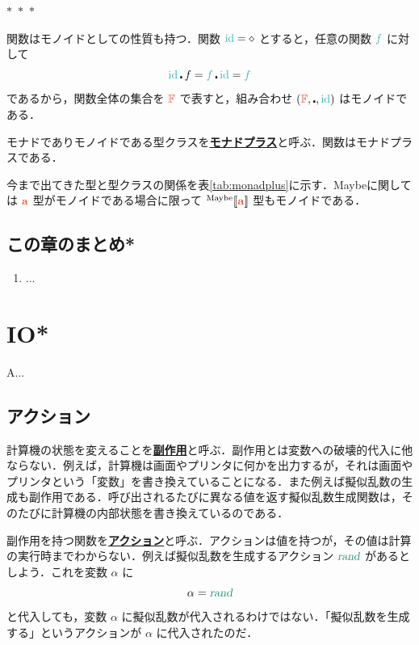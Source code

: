 \documentclass[a5paper,twoside,fleqn,draft]{jsbook}
\def\[{[\![}
\def\]{]\!]}
\def\funcColor{BlueGreen}
\def\actionColor{PineGreen}
\def\typeColor{RedOrange}
\newcommand{\separator}{\begin{center}$*$~$*$~$*$\end{center}}
\newcommand{\keyword}[1]{{\underline{\textbf{#1}}}}
\newcommand{\mAnonParam}{\diamond}
\newcommand{\mFunc}[1]{\textcolor{\funcColor}{#1}}
\newcommand{\mSpecialFunc}[1]{\textcolor{\funcColor}{\textrm{#1}}}
\newcommand{\mFFunc}{{\mFunc{f}}}
\DeclareMathOperator{\mId}{\mSpecialFunc{id}}
\newcommand{\mActionLong}[1]{\textcolor{\actionColor}{\textsl{#1}}}
\DeclareMathOperator{\mRand}{\mActionLong{rand}}
\DeclareMathOperator{\mCompFunc}{\centerdot}
\newcommand{\mSpecialSet}[1]{\textcolor{\typeColor}{\mathbb{#1}}}
\newcommand{\mFSet}{\mSpecialSet{F}}
\newcommand{\mType}[1]{\textcolor{\typeColor}{\mathbf{#1}}}
\newcommand{\mA}{\mType{a}}
\newcommand{\mTypeAssemble}[2]{{}^\mathrm{#1}\[\mType{#2}\]}
\newcommand{\mMaybeType}[1]{\mTypeAssemble{Maybe}{#1}}
\begin{document}
\separator

関数はモノイドとしての性質も持つ．関数 $\mId=\mAnonParam$ とすると，任意の関数 $\mFFunc$ に対して
\begin{equation}
\mId\mCompFunc f=\mFFunc\mCompFunc\mId=\mFFunc
\end{equation}
であるから，関数全体の集合を $\mFSet$ で表すと，組み合わせ $(\mFSet,\mCompFunc,\mId)$ はモノイドである．

モナドでありモノイドである型クラスを\keyword{モナドプラス}と呼ぶ．関数はモナドプラスである．

今まで出てきた型と型クラスの関係を表\ref{tab:monadplus}に示す．Maybeに関しては $\mA $ 型がモノイドである場合に限って $\mMaybeType{a}$ 型もモノイドである．

\section{この章のまとめ*}

\begin{enumerate}
\item ...
\end{enumerate}


\chapter{IO*}
\label{ch:io}

A...

\section{アクション}

計算機の状態を変えることを\keyword{副作用}と呼ぶ．副作用とは変数への破壊的代入に他ならない．例えば，計算機は画面やプリンタに何かを出力するが，それは画面やプリンタという「変数」を書き換えていることになる．また例えば擬似乱数の生成も副作用である．呼び出されるたびに異なる値を返す擬似乱数生成関数は，そのたびに計算機の内部状態を書き換えているのである．

副作用を持つ関数を\keyword{アクション}と呼ぶ．アクションは値を持つが，その値は計算の実行時までわからない．例えば擬似乱数を生成するアクション $\mRand$ があるとしよう．これを変数 $\alpha$ に
\begin{equation}
\alpha=\mRand
\end{equation}
と代入しても，変数 $\alpha$ に擬似乱数が代入されるわけではない．「擬似乱数を生成する」というアクションが $\alpha$ に代入されたのだ．
\end{document}

